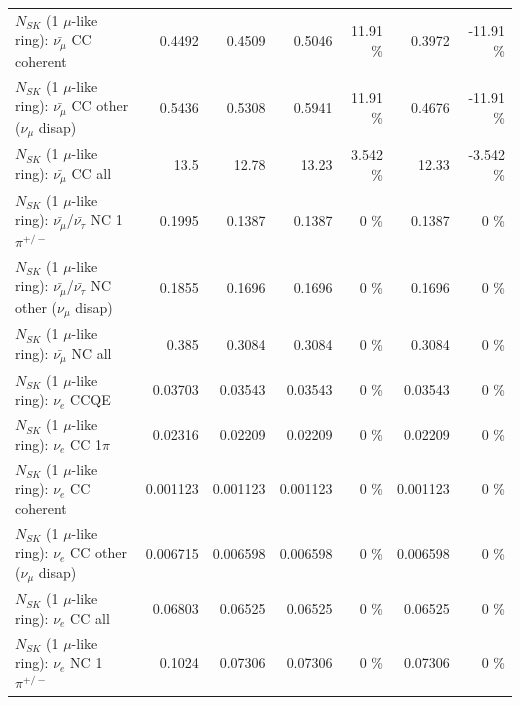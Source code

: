 \begin{table}
\begin{tabular}{| l | r | r | r  r | r  r |}
                       $N_{SK}$ (1 $\mu$-like ring): $\bar{\nu_\mu}$ CC coherent &          0.4492 &          0.4509 &          0.5046 &    11.91 \%  &          0.3972 &   -11.91 \%  \\ 
        $N_{SK}$ (1 $\mu$-like ring): $\bar{\nu_\mu}$ CC other ($\nu_\mu$ disap) &          0.5436 &          0.5308 &          0.5941 &    11.91 \%  &          0.4676 &   -11.91 \%  \\ 
                          $N_{SK}$ (1 $\mu$-like ring): $\bar{\nu_{\mu}}$ CC all &            13.5 &           12.78 &           13.23 &    3.542 \%  &           12.33 &   -3.542 \%  \\ 
\hline
  $N_{SK}$ (1 $\mu$-like ring): $\bar{\nu_\mu}$/$\bar{\nu_\tau}$ NC 1$\pi^{+/-}$ &          0.1995 &          0.1387 &          0.1387 &        0 \%  &          0.1387 &        0 \%  \\ 
$N_{SK}$ (1 $\mu$-like ring): $\bar{\nu_\mu}$/$\bar{\nu_\tau}$ NC other ($\nu_\mu$ disap) &          0.1855 &          0.1696 &          0.1696 &        0 \%  &          0.1696 &        0 \%  \\ 
                          $N_{SK}$ (1 $\mu$-like ring): $\bar{\nu_{\mu}}$ NC all &           0.385 &          0.3084 &          0.3084 &        0 \%  &          0.3084 &        0 \%  \\ 
\hline
\hline
\hline
                                      $N_{SK}$ (1 $\mu$-like ring): $\nu_e$ CCQE &         0.03703 &         0.03543 &         0.03543 &        0 \%  &         0.03543 &        0 \%  \\ 
                                 $N_{SK}$ (1 $\mu$-like ring): $\nu_e$ CC 1$\pi$ &         0.02316 &         0.02209 &         0.02209 &        0 \%  &         0.02209 &        0 \%  \\ 
                               $N_{SK}$ (1 $\mu$-like ring): $\nu_e$ CC coherent &        0.001123 &        0.001123 &        0.001123 &        0 \%  &        0.001123 &        0 \%  \\ 
                $N_{SK}$ (1 $\mu$-like ring): $\nu_e$ CC other ($\nu_\mu$ disap) &        0.006715 &        0.006598 &        0.006598 &        0 \%  &        0.006598 &        0 \%  \\ 
                                  $N_{SK}$ (1 $\mu$-like ring): $\nu_{e}$ CC all &         0.06803 &         0.06525 &         0.06525 &        0 \%  &         0.06525 &        0 \%  \\ 
\hline
                           $N_{SK}$ (1 $\mu$-like ring): $\nu_e$ NC 1$\pi^{+/-}$ &          0.1024 &         0.07306 &         0.07306 &        0 \%  &         0.07306 &        0 \%  \\ 

\end{tabular}
\end{table}
